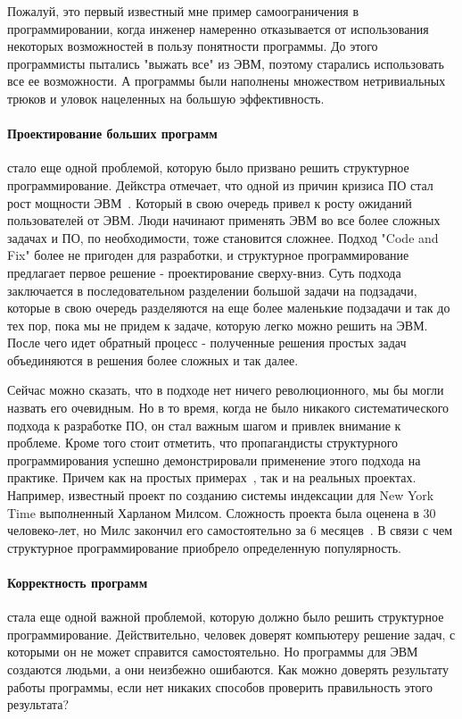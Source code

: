 Пожалуй, это первый известный мне пример самоограничения в программировании, когда инженер намеренно отказывается от использования некоторых возможностей в пользу понятности программы. До этого программисты пытались "выжать все" из ЭВМ, поэтому старались использовать все ее возможности. А программы были наполнены множеством нетривиальных трюков и уловок нацеленных на большую эффективность.

\paragraph{Проектирование больших программ} стало еще одной проблемой, которую было призвано решить структурное программирование. Дейкстра отмечает, что одной из причин кризиса ПО стал рост мощности ЭВМ~\cite{Dijkstra:1972:HP}. Который в свою очередь привел к росту ожиданий пользователей от ЭВМ. Люди начинают применять ЭВМ во все более сложных задачах и ПО, по необходимости, тоже становится сложнее. Подход "Code and Fix" более не пригоден для разработки, и структурное программирование предлагает первое решение - проектирование сверху-вниз. Суть подхода заключается в последовательном разделении большой задачи на подзадачи, которые в свою очередь разделяются на еще более маленькие подзадачи и так до тех пор, пока мы не придем к задаче, которую легко можно решить на ЭВМ. После чего идет обратный процесс - полученные решения простых задач объединяются в решения более сложных и так далее.

Сейчас можно сказать, что в подходе нет ничего революционного, мы бы могли назвать его очевидным. Но в то время, когда не было никакого систематического подхода к разработке ПО, он стал важным шагом и привлек внимание к проблеме. Кроме того стоит отметить, что пропагандисты структурного программирования успешно демонстрировали применение этого подхода на практике. Причем как на простых примерах~\cite{Wirth:1971:PDS}, так и на реальных проектах. Например, известный проект по созданию системы индексации для New York Time выполненный Харланом Милсом. Сложность проекта была оценена в 30 человеко-лет, но Милс закончил его самостоятельно за 6 месяцев~\cite{Aron:1979:SP}. В связи с чем структурное программирование приобрело определенную популярность.

\paragraph{Корректность программ} стала еще одной важной проблемой, которую должно было решить структурное программирование. Действительно, человек доверят компьютеру решение задач, с которыми он не может справится самостоятельно. Но программы для ЭВМ создаются людьми, а они неизбежно ошибаются. Как можно доверять результату работы программы, если нет никаких способов проверить правильность этого результата?

